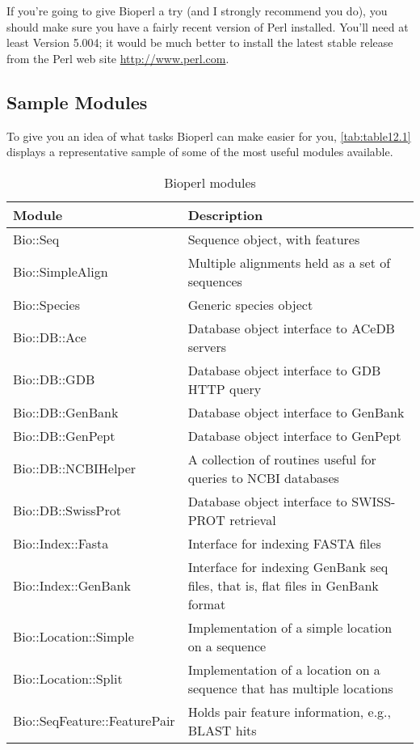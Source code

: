 If you're going to give Bioperl a try (and I strongly recommend you do), you should make sure you have a fairly recent version of Perl installed.  You'll need at least Version 5.004; it would be much better to install the latest stable release from the Perl web site \href{http://www.perl.com}{http://www.perl.com}. 

\subsection{Sample Modules}
To give you an idea of what tasks Bioperl can make easier for you, \autoref{tab:table12.1} displays a representative sample of some of the most useful modules available. 

\begin{table}[!htbp]
  \begin{center}
  \caption{Bioperl modules}
  \label{tab:table12.1}
  \begin{tabu}{X[2,l]X[3,l]}
  \toprule
  Module & Description\\
  \midrule
  Bio::Seq & Sequence object, with features\\
  Bio::SimpleAlign & Multiple alignments held as a set of sequences\\
  Bio::Species & Generic species object\\
  Bio::DB::Ace & Database object interface to ACeDB servers\\
  Bio::DB::GDB & Database object interface to GDB HTTP query\\
  Bio::DB::GenBank & Database object interface to GenBank\\
  Bio::DB::GenPept & Database object interface to GenPept\\
  Bio::DB::NCBIHelper & A collection of routines useful for queries to NCBI databases\\
  Bio::DB::SwissProt & Database object interface to SWISS-PROT retrieval\\
  Bio::Index::Fasta & Interface for indexing FASTA files\\
  Bio::Index::GenBank & Interface for indexing GenBank seq files, that is, flat files in GenBank format\\
  Bio::Location::Simple & Implementation of a simple location on a sequence\\
  Bio::Location::Split & Implementation of a location on a sequence that has multiple locations\\
  Bio::SeqFeature::FeaturePair & Holds pair feature information, e.g., BLAST hits\\

\end{tabu}
\end{center}
\end{table}
